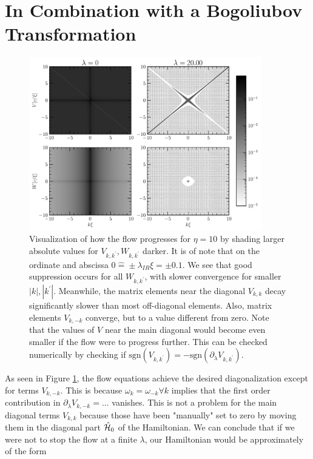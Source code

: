 \section{In Combination with a Bogoliubov Transformation}
\begin{figure}[H]
    \centering
    \includegraphics[width=0.9\textwidth]{figures/plots/PDF/FlowIllustration.pdf}
    \caption[Flow Visualization for $\eta=10$]{Visualization of how the flow progresses for $\eta=10$ by shading larger absolute values for $V_{k,k^\prime},W_{k,k^\prime}$ darker. It is of note that on the ordinate and abscissa $0\widehat = \pm \lambda_{IR}\xi=\pm 0.1$. We see that good suppression occurs for all $W_{k,k^\prime}$, with slower convergence for smaller $|k|,|k^\prime|$.  Meanwhile, the matrix elements near the diagonal $V_{k,k}$ decay significantly slower than most off-diagonal elements. Also, matrix elements $V_{k,-k}$ converge, but to a value different from zero. Note that the values of $V$ near the main diagonal would  become even smaller if the flow were to progress further. This can be checked numerically by checking if $\mathrm{sgn}\left( V_{k,k^\prime}\right)=-\mathrm{sgn}\left( \partial_\lambda V_{k,k^\prime}\right)$.}
    \label{FlowIllustration}
\end{figure}
As seen in Figure \ref{FlowIllustration}, the flow equations achieve the desired diagonalization except for terms $V_{k,-k}$. This is because $\omega_k=\omega_{-k}\forall k$ implies that the first order contribution in $\partial_\lambda V_{k,-k} =...$ vanishes. This is not a problem for the main diagonal terms $V_{k,k}$ because those have been "manually" set to zero by moving them in the diagonal part $\hat{\mathcal{H}}_0$ of the Hamiltonian. We can conclude that if we were not to stop the flow at a finite $\lambda$, our Hamiltonian would be approximately of the form 
